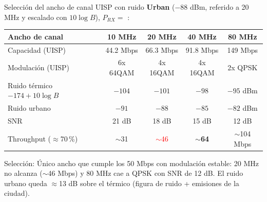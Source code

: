 \begin{frame}{Selección del ancho de canal}
  \small
  UISP con ruido \textbf{Urban} ($-88$ dBm, referido a 20 MHz y escalado con $10\log B$), $P_{RX}=$ \EBprxSim:\\[4pt]
  \centering
  \begin{tabular}{@{}lcccc@{}}
    \toprule
    \textbf{Ancho de canal} & 10 MHz & 20 MHz & \cellcolor{naranja!25}\textbf{40 MHz} & 80 MHz \\ \midrule
    Capacidad (UISP) & 44.2 Mbps & 66.3 Mbps & \cellcolor{naranja!25}91.8 Mbps & 149 Mbps \\
    Modulación (UISP) & 6x 64QAM & 4x 16QAM & \cellcolor{naranja!25}4x 16QAM & 2x QPSK \\
    Ruido térmico $-174+10\log B$ & $-104$ & $-101$ & \cellcolor{naranja!25}$-98$ & $-95$ dBm \\
    Ruido urbano & $-91$ & $-88$ & \cellcolor{naranja!25}$-85$ & $-82$ dBm \\
    SNR & 21 dB & 18 dB & \cellcolor{naranja!25}15 dB & 12 dB \\
    Throughput ($\approx$70\,\%) & $\sim$31 & \textcolor{red}{$\sim$46} & \cellcolor{naranja!25}\textbf{$\sim$64} & $\sim$104 Mbps \\
    \bottomrule
  \end{tabular}
  \raggedright
  \vspace{6pt}
  \begin{alertblock}{Selección: \EBcanal}
    Único ancho que cumple los 50 Mbps con modulación estable: 20 MHz no alcanza
    ($\sim$46 Mbps) y 80 MHz cae a QPSK con SNR de 12 dB. El ruido urbano queda
    $\approx$13 dB sobre el térmico (figura de ruido + emisiones de la ciudad).
  \end{alertblock}
\end{frame}

